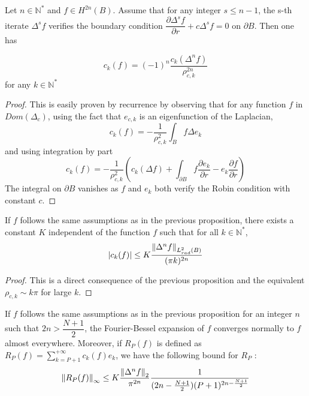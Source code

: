 \documentclass[11pt,a4paper]{article}
\begin{document}
\begin{Prop} Let $n\in \mathbb{N}^*$ and $f \in H^{2n}(B)$. Assume that for any integer $s\leq n-1$, the s-th iterate $\Delta^s f$ verifies the boundary condition $\dfrac{\partial \Delta^s f}{\partial r} + c \Delta^s f = 0$ on $\partial B$. Then one has 

\[ c_k(f) = (-1)^{n}\dfrac{c_k(\Delta^n f)}{\rho_{c,k}^{2n}}\] for any $k \in \mathbb{N}^*$
\begin{proof}
This is easily proven by recurrence by observing that for any function $f$ in $Dom(\Delta_c)$, using the fact that $e_{c,k}$ is an eigenfunction of the Laplacian, \[c_k(f) = -\frac{1}{\rho_{c,k}^2}\int_B f \Delta e_{k}\] and using integration by part \[c_k(f) = -\frac{1}{\rho_{c,k}^2} \left(c_k(\Delta f) + \int_{\partial B} f \dfrac{\partial e_{k}}{\partial r} - e_{k} \dfrac{\partial f}{\partial r}\right) \]
The integral on $\partial B$ vanishes as $f$ and $e_{k}$ both verify the Robin condition with constant $c$.
\end{proof}
\label{PropDecrCond}
\end{Prop}

\begin{Cor} If $f$ follows the same assumptions as in the previous proposition, there exists a constant $K$ independent of the function $f$ such that for all $k \in \mathbb{N^*}$, 
\[ |c_k(f)| \leq  K \dfrac{\left\|\Delta^n f\right\|_{L^2_{rad}(B)}}{(\pi k)^{2n}}\] 
\end{Cor}
\begin{proof}
This is a direct consequence of the previous proposition and the equivalent $\rho_{c,k} \sim k\pi$ for large $k$. 
\end{proof}

\begin{Cor} If $f$ follows the same assumptions as in the previous proposition for an integer $n$ such that $ 2n > \dfrac{N+1}{2}$, the Fourier-Bessel expansion of $f$ converges normally to $f$ almost everywhere. Moreover, if $R_P(f)$ is defined as $R_P(f) = \displaystyle\sum_{k = P+1}^{+\infty} c_{k}(f) e_{k}$, we have the following bound for $R_P$ : 
\[\left\|R_P(f)\right\|_\infty \leq K \dfrac{\left\|\Delta^n f\right\|_{2}}{\pi^{2n}}\dfrac{1}{(2n-\frac{N+1}{2})(P+1)^{2n-\frac{N+1}{2}}}\]
\label{EstimationRest}
\end{Cor}
\end{document}
